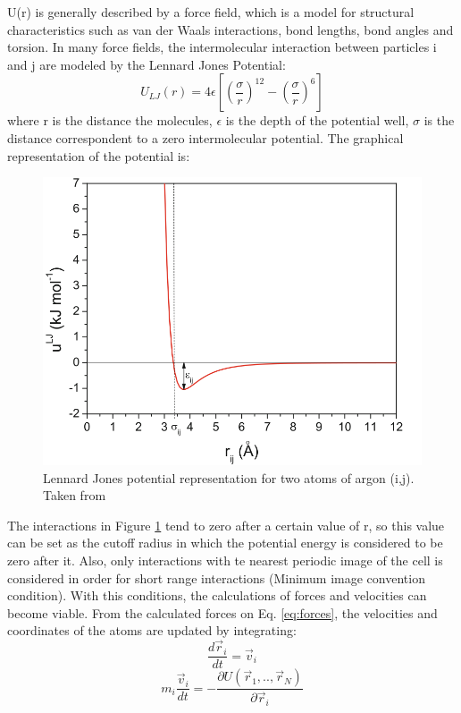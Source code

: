U(r) is generally described by a force field, which is a model for structural characteristics such as van der Waals interactions, bond lengths, bond angles and torsion. In many force fields, the intermolecular interaction between particles i and j are modeled by the Lennard Jones Potential:
\begin{equation}
U_{LJ}(r) = 4 \epsilon
\left[ \left(\frac{\sigma}{r} \right)^{12} - \left(\frac{\sigma}{r} \right)^{6} \right]
\end{equation}
where r is the distance the molecules, $\epsilon$ is the depth of the potential well, $\sigma$ is the distance correspondent to a zero intermolecular potential. The graphical representation of the potential is:
\begin{figure}[H]
\centering
\includegraphics[width=0.8\linewidth]{Figures/lj2}
\caption{Lennard Jones potential representation for two atoms of argon (i,j). Taken from  }
\label{fig:lj}
\end{figure}

The interactions in Figure \ref{fig:lj} tend to zero after a certain value of r, so this value can be set as the cutoff radius in which the potential energy is considered to be zero after it. Also, only interactions with te nearest periodic image of the cell is considered in order   for short range interactions (Minimum image convention condition). With this conditions, the calculations of forces and velocities can become viable. From the calculated forces on Eq. \eqref{eq:forces}, the velocities and coordinates of the atoms are updated by integrating:
\begin{equation}
\frac{d \vec{r}_{i}}{dt} = \vec{v}_{i}
\end{equation}
\begin{equation}
m_{i} \frac{\vec{v}_{i}}{dt} = - \frac{\partial U (\vec{r}_{1},..,\vec{r}_{N})}{\partial \vec{r}_{i}}
\end{equation}

